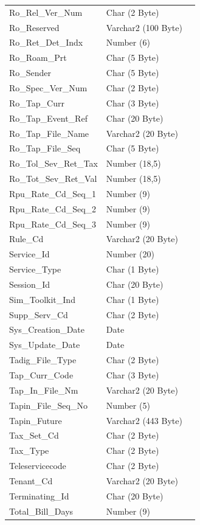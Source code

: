 \documentclass[12pt,twoside]{article}
\begin{document}
\begin{longtable}{l|l|l}
Ro\_Rel\_Ver\_Num & Char (2 Byte) & \\
Ro\_Reserved & Varchar2 (100 Byte) & \\
Ro\_Ret\_Det\_Indx & Number (6) & \\
Ro\_Roam\_Prt & Char (5 Byte) & \\
Ro\_Sender & Char (5 Byte) & \\
Ro\_Spec\_Ver\_Num & Char (2 Byte) & \\
Ro\_Tap\_Curr & Char (3 Byte) & \\
Ro\_Tap\_Event\_Ref & Char (20 Byte) & \\
Ro\_Tap\_File\_Name & Varchar2 (20 Byte) & \\
Ro\_Tap\_File\_Seq & Char (5 Byte) & \\
Ro\_Tol\_Sev\_Ret\_Tax & Number (18,5) & \\
Ro\_Tot\_Sev\_Ret\_Val & Number (18,5) & \\
Rpu\_Rate\_Cd\_Seq\_1 & Number (9) & \\
Rpu\_Rate\_Cd\_Seq\_2 & Number (9) & \\
Rpu\_Rate\_Cd\_Seq\_3 & Number (9) & \\
Rule\_Cd & Varchar2 (20 Byte) & \\
Service\_Id & Number (20) & \\
Service\_Type & Char (1 Byte) & \\
Session\_Id & Char (20 Byte) & \\
Sim\_Toolkit\_Ind & Char (1 Byte) & \\
Supp\_Serv\_Cd & Char (2 Byte) & \\
Sys\_Creation\_Date & Date & \\
Sys\_Update\_Date & Date & \\
Tadig\_File\_Type & Char (2 Byte) & \\
Tap\_Curr\_Code & Char (3 Byte) & \\
Tap\_In\_File\_Nm & Varchar2 (20 Byte) & \\
Tapin\_File\_Seq\_No & Number (5) & \\
Tapin\_Future & Varchar2 (443 Byte) & \\
Tax\_Set\_Cd & Char (2 Byte) & \\
Tax\_Type & Char (2 Byte) & \\
Teleservicecode & Char (2 Byte) & \\
Tenant\_Cd & Varchar2 (20 Byte) & \\
Terminating\_Id & Char (20 Byte) & \\
Total\_Bill\_Days & Number (9) & \\

\end{longtable}
\end{document}
